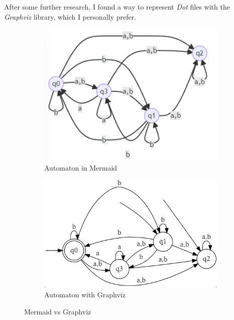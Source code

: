 After some further research, I found a way to represent \textit{Dot} files with the \textit{Graphviz} library, which I personally prefer.

\begin{figure}[!htb]
  \centering
  \begin{subfigure}[b]{0.3\textwidth}
    \includegraphics[width=\textwidth]{img/aut_mermaid.png}
    \caption{Automaton in Mermaid}
  \end{subfigure}
  \begin{subfigure}[b]{0.3\textwidth}
    \includegraphics[width=\textwidth]{img/aut_graphviz.png}
    \caption{Automaton with Graphviz}
    \label{fig:graphviz-aut}
  \end{subfigure}
  \caption{Mermaid vs Graphviz}
  \label{fig:mermaidGraphviz}
\end{figure}



